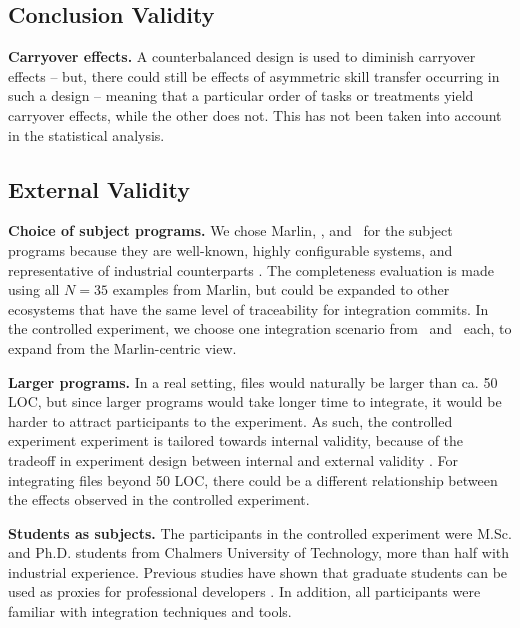 \subsection{Conclusion Validity}

\textbf{Carryover effects.} A counterbalanced design is used to diminish carryover effects -- but, there could still be effects of asymmetric skill transfer occurring in such a design -- meaning that a particular order of tasks or treatments yield carryover effects, while the other does not. This has not been taken into account in the statistical analysis.

\subsection{External Validity}
\textbf{Choice of subject programs.} We chose Marlin, \busybox, and \vim~for the subject programs because they are well-known, highly configurable systems, and representative of industrial counterparts \cite{hunsen2016}. The completeness evaluation is made using all $N=35$ examples from Marlin, but could be expanded to other ecosystems that have the same level of traceability for integration commits. In the controlled experiment, we choose one integration scenario from \busybox~and \vim~each, to expand from the Marlin-centric view. 

\textbf{Larger programs.} In a real setting, files would naturally be larger than ca. 50 LOC, but since larger programs would take longer time to integrate, it would be harder to attract participants to the experiment. As such, the controlled experiment experiment is tailored towards internal validity, because of the tradeoff in experiment design between internal and external validity \cite{siegmund2015}. For integrating files beyond 50 LOC, there could be a different relationship between the effects observed in the controlled experiment.

\textbf{Students as subjects.} The participants in the controlled experiment were M.Sc. and Ph.D. students from Chalmers University of Technology, more than half with industrial experience. Previous studies have shown that graduate students can be used as proxies for professional developers \cite{buse2011}. In addition, all participants were familiar with integration techniques and tools.
